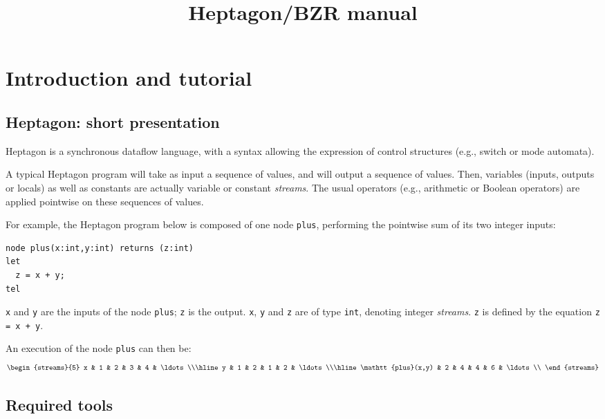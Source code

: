 \documentclass[a4paper]{article}
\title{Heptagon/BZR manual}
\author{}
\begin{document}
\maketitle

\section{Introduction and tutorial}
\label{sec:intro}

\subsection{Heptagon: short presentation}
\label{sec:hept-short-pres}

Heptagon is a synchronous dataflow language, with a syntax allowing the
expression of control structures (e.g., switch or mode automata).

A typical Heptagon program will take as input a sequence of values, and will
output a sequence of values. Then, variables (inputs, outputs or locals) as well
as constants are actually variable or constant \emph{streams}. The usual
operators (e.g., arithmetic or Boolean operators) are applied pointwise on these
sequences of values.

For example, the Heptagon program below is composed of one node \texttt{plus},
performing the pointwise sum of its two integer inputs:

\begin{lstlisting}
node plus(x:int,y:int) returns (z:int)
let
  z = x + y;
tel
\end{lstlisting}

\texttt{x} and \texttt{y} are the inputs of the node \texttt{plus}; \texttt{z}
is the output. \texttt{x}, \texttt{y} and \texttt{z} are of type \texttt{int},
denoting integer \emph{streams}. \texttt{z} is defined by the equation
\lstinline|z = x + y|.

An execution of the node \texttt{plus} can then be:
\[
\begin{streams}{5}
  x & 1 & 2 & 3 & 4 & \ldots\\\hline
  y & 1 & 2 & 1 & 2 & \ldots\\\hline
  \mathtt{plus}(x,y) & 2 & 4 & 4 & 6 & \ldots\\
\end{streams}
\]

\subsection{Required tools}
\label{sec:required-tools}
\end{document}
